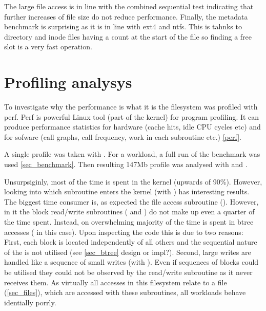         The large file access is in line with the combined sequential test
        indicating that further increases of file size do not reduce
        performance. Finally, the metadata benchmark is surprising as it is in
        line with ext4 and ntfs. This is tahnks to directory and inode files
        having a count at the start of the file so finding a free slot is a
        very fast operation.

    \section{Profiling analysys}
        \label{sec_perf}

        To investigate why the performance is what it is the filesystem was
        profiled with perf. Perf is powerful Linux tool (part of the kernel)
        for program profiling. It can produce performance statistics for
        hardware (cache hits, idle CPU cycles etc) and for sofware (call
        graphs, call frequency, work in each subroutine etc.) \ref{perf}.

        A single profile was taken with . For a workload, a full run of the benchmark was used
        \ref{sec_benchmark}. Then resulting 147Mb profile was analysed with
         and .

        Unsurpsiginly, most of the time is spent in the kernel (upwards of
        90\%). However, looking into which subroutine enters the kernel (with
        ) has interesting results. The biggest time
        consumer is, as expected the file access subroutine
        ().  However, in it the block
        read/write subroutines ( and
        ) do not make up even a quarter of the time
        spent. Instead, on overwhelming majority of the time is spent in btree
        accesses ( in this case). Upon inspecting
        the code this is due to two reasons: First, each block is located
        independently of all others and the sequential nature of the \bplustree
        is not utilised (see \ref{sec_btree} design or impl?). Second, large
        writes are handled like a sequence of small writes (with
        ). Even if sequences of blocks
        could be utilised they could not be observed by the read/write
        subroutine as it never receives them. As virtually all accesses in this
        filesystem relate to a file (\ref{sec_files}), which are accessed with
        these subroutines, all workloads behave identially porrly.

